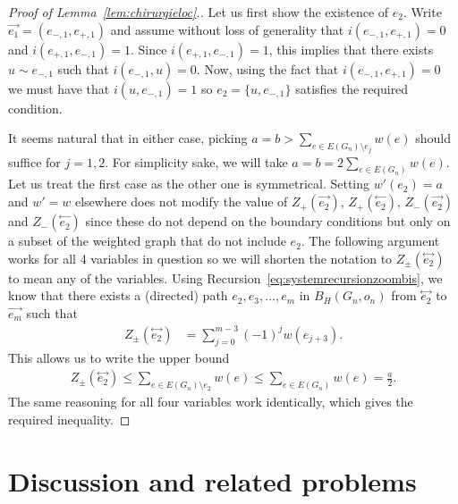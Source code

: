 \documentclass[11pt]{article}
\begin{document}
\begin{proof}[Proof of Lemma~\ref{lem:chirurgieloc}.]
        Let us first show the existence of $e_2$.
        Write $\overset{\rightarrow}{e_1}=(e_{-,1},e_{+,1})$ and assume without loss of generality that $i(e_{-,1},e_{+,1})=0$ and $i(e_{+,1},e_{-,1})=1$.
        Since $i(e_{+,1},e_{-,1})=1$, this implies that there exists $u \sim e_{-,1}$ such that $i(e_{-,1},u)=0$.
        Now, using the fact that $i(e_{-,1},e_{+,1})=0$ we must have that $i(u,e_{-,1})=1$ so $e_2=\{u,e_{-,1}\}$ satisfies the required condition.
        
        It seems natural that in either case, picking $a=b>\sum_{e \in E(G_n) \setminus e_j}w(e)$ should suffice for $j=1,2$. For simplicity sake, we will take $a=b=2\sum_{e \in E(G_n)} w(e)$.
        Let us treat the first case as the other one is symmetrical. Setting $w'(e_2)=a$ and $w'=w$ elsewhere does not modify the value of $Z_{+}(\overset{\rightarrow}{e_2})$, $Z_{+}(\overset{\leftarrow}{e_2})$, $Z_{-}(\overset{\rightarrow}{e_2})$ and $Z_{-}(\overset{\leftarrow}{e_2})$  since these do not depend on the boundary conditions but only on a subset of the weighted graph that do not include $e_2$.
        The following argument works for all 4 variables in question so we will shorten the notation to $Z_{\pm}(\overset{\leftrightarrow}{e_2})$ to mean any of the variables. Using Recursion~\eqref{eq:systemrecursionzoombis}, we know that there exists a (directed) path $e_2,e_3,\dots,e_{m}$ in $B_H(G_n,o_n)$ from $\overset{\leftrightarrow}{e_2}$ to $\overset{\rightarrow}{e_{m}}$ such that  
        \begin{align*}
            Z_{\pm}(\overset{\leftrightarrow}{e_2})&=\sum_{j=0}^{m-3} (-1)^j w(e_{j+3})  .
        \end{align*}
        This allows us to write the upper bound
        \begin{align}
            Z_{\pm}(\overset{\leftrightarrow}{e_2})\leq \sum_{e\in E(G_n)\setminus e_2}w(e)\leq \sum_{e\in E(G_n)}w(e) = \frac{a}{2} .
        \end{align}
        The same reasoning for all four variables work identically, which gives the required inequality.
    \end{proof}

    

\section{Discussion and related problems}\label{sec:final}
\end{document}
